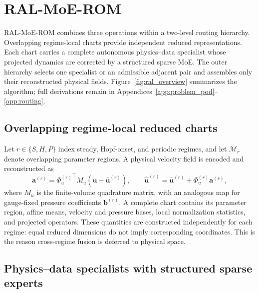 \section{RAL-MoE-ROM}
\label{sec:method}

RAL-MoE-ROM combines three operations within a two-level routing hierarchy.
Overlapping regime-local charts provide independent reduced representations.
Each chart carries a complete autonomous physics--data specialist whose projected
dynamics are corrected by a structured sparse MoE. The outer hierarchy selects one
specialist or an admissible adjacent pair and assembles only their reconstructed
physical fields. Figure~\ref{fig:ral_overview} summarizes the algorithm; full
derivations remain in Appendices~\ref{app:problem_pod}--\ref{app:routing}.

\subsection{Overlapping regime-local reduced charts}

Let $r\in\{S,H,P\}$ index steady, Hopf-onset, and periodic regimes, and let
$\mathcal M_r$ denote overlapping parameter regions. A physical velocity field is
encoded and reconstructed as
\begin{equation}
  \bm a^{(r)}={\Phi_u^{(r)}}^{\top}M_u(\bm u-\bar{\bm u}^{(r)}),\qquad
  \widehat{\bm u}^{(r)}=\bar{\bm u}^{(r)}+\Phi_u^{(r)}\bm a^{(r)},
  \label{eq:main_chart}
\end{equation}
where $M_u$ is the finite-volume quadrature matrix, with an analogous map for
gauge-fixed pressure coefficients $\bm b^{(r)}$. A complete chart contains its
parameter region, affine means, velocity and pressure bases, local normalization
statistics, and projected operators. These quantities are constructed independently
for each regime: equal reduced dimensions do not imply corresponding coordinates.
This is the reason cross-regime fusion is deferred to physical space.

\subsection{Physics--data specialists with structured sparse experts}

